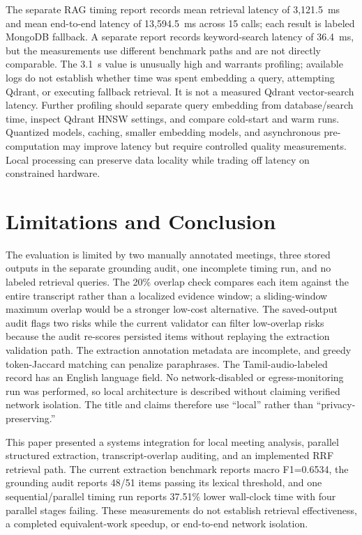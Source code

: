 \documentclass[conference]{IEEEtran}
\begin{document}
The separate RAG timing report records mean retrieval latency of 3,121.5~ms and mean end-to-end latency of 13,594.5~ms across 15 calls; each result is labeled MongoDB fallback. A separate report records keyword-search latency of 36.4~ms, but the measurements use different benchmark paths and are not directly comparable. The 3.1~s value is unusually high and warrants profiling; available logs do not establish whether time was spent embedding a query, attempting Qdrant, or executing fallback retrieval. It is not a measured Qdrant vector-search latency. Further profiling should separate query embedding from database/search time, inspect Qdrant HNSW settings, and compare cold-start and warm runs. Quantized models, caching, smaller embedding models, and asynchronous pre-computation may improve latency but require controlled quality measurements. Local processing can preserve data locality while trading off latency on constrained hardware.

\section{Limitations and Conclusion}

The evaluation is limited by two manually annotated meetings, three stored outputs in the separate grounding audit, one incomplete timing run, and no labeled retrieval queries. The 20\% overlap check compares each item against the entire transcript rather than a localized evidence window; a sliding-window maximum overlap would be a stronger low-cost alternative. The saved-output audit flags two risks while the current validator can filter low-overlap risks because the audit re-scores persisted items without replaying the extraction validation path. The extraction annotation metadata are incomplete, and greedy token-Jaccard matching can penalize paraphrases. The Tamil-audio-labeled record has an English language field. No network-disabled or egress-monitoring run was performed, so local architecture is described without claiming verified network isolation. The title and claims therefore use ``local'' rather than ``privacy-preserving.''

This paper presented a systems integration for local meeting analysis, parallel structured extraction, transcript-overlap auditing, and an implemented RRF retrieval path. The current extraction benchmark reports macro F1=0.6534, the grounding audit reports 48/51 items passing its lexical threshold, and one sequential/parallel timing run reports 37.51\% lower wall-clock time with four parallel stages failing. These measurements do not establish retrieval effectiveness, a completed equivalent-work speedup, or end-to-end network isolation.
\end{document}
